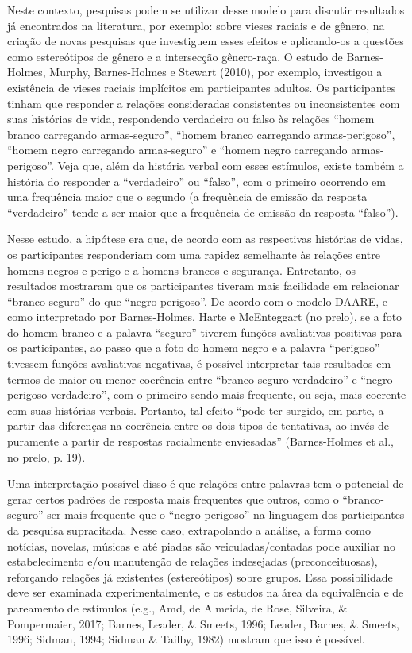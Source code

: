 Neste contexto, pesquisas podem se utilizar desse modelo para discutir resultados já encontrados na literatura, por exemplo: sobre vieses raciais e de gênero, na criação de novas pesquisas que investiguem esses efeitos e aplicando-os a questões como estereótipos de gênero e a intersecção gênero-raça. O estudo de Barnes-Holmes, Murphy, Barnes-Holmes e Stewart (2010), por exemplo, investigou a existência de vieses raciais implícitos em participantes adultos. Os participantes tinham que responder a relações consideradas consistentes ou inconsistentes com suas histórias de vida, respondendo verdadeiro ou falso às relações ``homem branco carregando armas-seguro'', ``homem branco carregando armas-perigoso'', ``homem negro carregando armas-seguro'' e ``homem negro carregando armas-perigoso''. Veja que, além da história verbal com esses estímulos, existe também a história do responder a ``verdadeiro'' ou ``falso'', com o primeiro ocorrendo em uma frequência maior que o segundo (a frequência de emissão da resposta ``verdadeiro'' tende a ser maior que a frequência de emissão da resposta ``falso''). 

Nesse estudo, a hipótese era que, de acordo com as respectivas histórias de vidas, os participantes responderiam com uma rapidez semelhante às relações entre homens negros e perigo e a homens brancos e segurança. Entretanto, os resultados mostraram que os participantes tiveram mais facilidade em relacionar ``branco-seguro'' do que ``negro-perigoso''. De acordo com o modelo DAARE, e como interpretado por Barnes-Holmes, Harte e McEnteggart (no prelo), se a foto do homem branco e a palavra ``seguro'' tiverem funções avaliativas positivas para os participantes, ao passo que a foto do homem negro e a palavra ``perigoso'' tivessem funções avaliativas negativas, é possível interpretar tais resultados em termos de maior ou menor coerência entre ``branco-seguro-verdadeiro'' e ``negro-perigoso-verdadeiro'', com o primeiro sendo mais frequente, ou seja, mais coerente com suas histórias verbais. Portanto, tal efeito ``pode ter surgido, em parte, a partir das diferenças na coerência entre os dois tipos de tentativas, ao invés de puramente a partir de respostas racialmente enviesadas'' (Barnes-Holmes et al., no prelo, p. 19).

Uma interpretação possível disso é que relações entre palavras tem o potencial de gerar certos padrões de resposta mais frequentes que outros, como o ``branco-seguro'' ser mais frequente que o ``negro-\linebreak perigoso'' na linguagem dos participantes da pesquisa supracitada. \linebreak Nesse caso, extrapolando a análise, a forma como notícias, novelas, músicas e até piadas são veiculadas/contadas pode auxiliar no estabelecimento e/ou manutenção de relações indesejadas (preconceituosas), reforçando relações já existentes (estereótipos) sobre grupos. Essa possibilidade deve ser examinada experimentalmente, e os estudos na área da equivalência e de pareamento de estímulos (e.g., Amd, de Almeida, de Rose, Silveira, \& Pompermaier, 2017; Barnes, Leader, \& Smeets, 1996; Leader, Barnes, \& Smeets, 1996; Sidman, 1994; Sidman \& Tailby, 1982) mostram que isso é possível.

